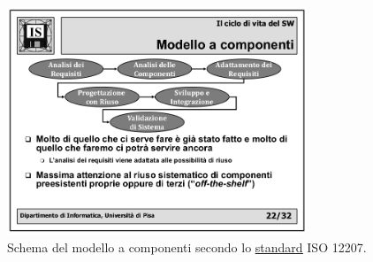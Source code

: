 			\begin{figure}[H]
				\centering
				\includegraphics[width=0.8\textwidth]{img/acomponenti}
				\caption{Schema del modello a componenti secondo lo \underline{\hyperref[standard]{standard}} ISO 12207.}
			\end{figure}

